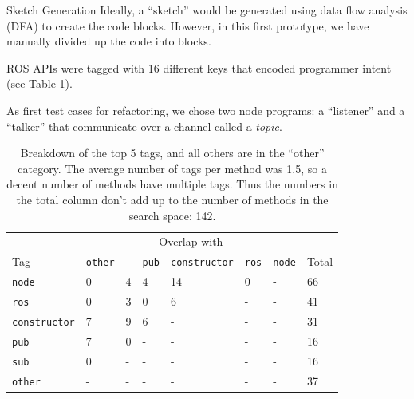 \documentclass[final]{beamer}
\newlength{\onecolwid}
\newlength{\twocolwid}
\begin{document}
\begin{frame}[t]
\begin{columns}[t]
\begin{column}{\twocolwid}
\begin{columns}[t,totalwidth=\twocolwid]
\begin{column}{\onecolwid}
\begin{block}{Sketch Generation}
Ideally, a ``sketch'' would be generated using data flow analysis (DFA) to create the code blocks. However, in this first prototype, we have manually divided up the code into blocks.

ROS APIs were tagged with 16 different keys that encoded programmer intent (see Table \ref{tab:tags}).

As first test cases for refactoring, we chose two node programs: a ``listener'' and a ``talker'' that communicate over a channel called a \textit{topic}.
\end{block}


\begin{table}[h]
	\footnotesize
	\begin{tabular}{llllllll}
						&\multicolumn{6}{c}{Overlap with}	\\
		Tag				&\texttt{other}	&\textt{sub}	&\texttt{pub}	&\texttt{constructor}	&\texttt{ros}	&\texttt{node}	&	Total	\\
		\texttt{node}	&0				&4				&4				&14						&0						&-				&66	\\
		\texttt{ros}	&0				&3				&0				&6						&-						&-				&41	\\
	\texttt{constructor}&7				&9				&6				&-						&-						&-				&31	\\
		\texttt{pub}	&7				&0				&-				&-						&-						&-				&16	\\
		\texttt{sub}	&0				&-				&-				&-						&-						&-				&16	\\
		\texttt{other}	&-				&-				&-				&-						&-						&-				&37
	\end{tabular}
	\caption{Breakdown of the top 5 tags, and all others are in the ``other'' category. The average number of tags per method was 1.5, so a decent number of methods have multiple tags. Thus the numbers in the total column don't add up to the number of methods in the search space: 142.}
	\label{tab:tags}
\end{table}





\end{column}
\end{columns}
\end{column}
\end{columns}
\end{frame}
\end{document}
